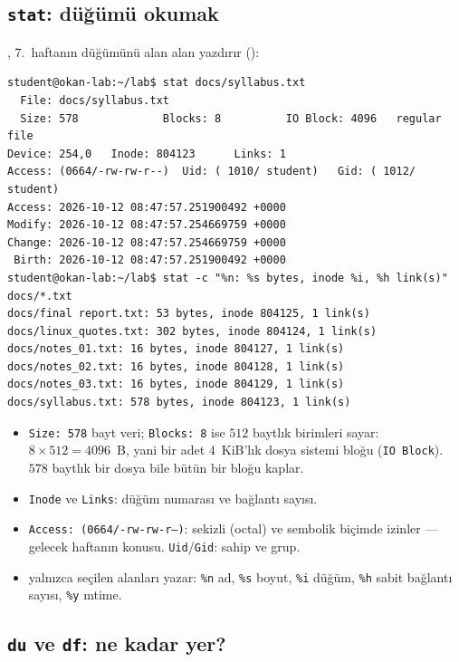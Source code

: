 \subsection{\texttt{stat}: düğümü okumak}
\label{sec:stat}

, 7.~haftanın düğümünü alan alan yazdırır ():

\begin{lstlisting}[style=term]
student@okan-lab:~/lab$ stat docs/syllabus.txt
  File: docs/syllabus.txt
  Size: 578             Blocks: 8          IO Block: 4096   regular file
Device: 254,0   Inode: 804123      Links: 1
Access: (0664/-rw-rw-r--)  Uid: ( 1010/ student)   Gid: ( 1012/ student)
Access: 2026-10-12 08:47:57.251900492 +0000
Modify: 2026-10-12 08:47:57.254669759 +0000
Change: 2026-10-12 08:47:57.254669759 +0000
 Birth: 2026-10-12 08:47:57.251900492 +0000
student@okan-lab:~/lab$ stat -c "%n: %s bytes, inode %i, %h link(s)" docs/*.txt
docs/final report.txt: 53 bytes, inode 804125, 1 link(s)
docs/linux_quotes.txt: 302 bytes, inode 804124, 1 link(s)
docs/notes_01.txt: 16 bytes, inode 804127, 1 link(s)
docs/notes_02.txt: 16 bytes, inode 804128, 1 link(s)
docs/notes_03.txt: 16 bytes, inode 804129, 1 link(s)
docs/syllabus.txt: 578 bytes, inode 804123, 1 link(s)
\end{lstlisting}

\begin{itemize}
  \item \texttt{Size: 578} bayt veri; \texttt{Blocks: 8} ise $512$ baytlık birimleri sayar: $8 \times 512 = 4096$~B, yani bir adet $4$~KiB'lık dosya sistemi bloğu (\texttt{IO Block}). $578$ baytlık bir dosya bile bütün bir bloğu kaplar.
  \item \texttt{Inode} ve \texttt{Links}: düğüm numarası ve bağlantı sayısı.
  \item \texttt{Access: (0664/-rw-rw-r--)}: sekizli (octal) ve sembolik biçimde izinler --- gelecek haftanın konusu. \texttt{Uid}/\texttt{Gid}: sahip ve grup.
  \item {} yalnızca seçilen alanları yazar: \texttt{\%n} ad, \texttt{\%s} boyut, \texttt{\%i} düğüm, \texttt{\%h} sabit bağlantı sayısı, \texttt{\%y} mtime.
\end{itemize}

\subsection{\texttt{du} ve \texttt{df}: ne kadar yer?}

